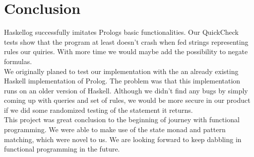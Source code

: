 
\section{Conclusion}\label{sec:Conclusion}
Haskellog successfully imitates Prologs basic functionalities. Our QuickCheck tests show that 
the program at least doesn't crash when fed strings representing rules our quiries. With more time we would maybe add the possibility to negate 
formulas.\\
We originally planed to test our implementation with the an already 
existing Haskell implementation of Prolog\cite{haskellprolog}. The problem was that this implementation runs on an older version of Haskell. 
Although we didn't find any bugs by simply coming up 
with queries and set of rules, we would be more secure 
in our product if we did some randomized testing of the 
statement it returns.\\
This project was great conclusion to the beginning of journey with functional programming. We were able to make
use of the state monad and pattern matching, which were novel to us. We are looking forward to keep dabbling in functional programming in the future.

